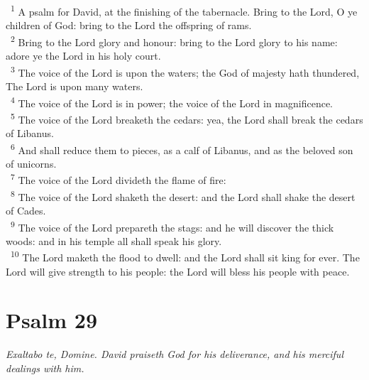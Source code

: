 \documentclass[a5paper,12pt]{article}
\begin{document}
\begin{multicols*}{2}
~\textsuperscript{1} A psalm for David, at the finishing of the tabernacle. Bring to the Lord, O ye children of God: bring to the Lord the offspring of rams.\\
~\textsuperscript{2} Bring to the Lord glory and honour: bring to the Lord glory to his name: adore ye the Lord in his holy court.\\
~\textsuperscript{3} The voice of the Lord is upon the waters; the God of majesty hath thundered, The Lord is upon many waters.\\
~\textsuperscript{4} The voice of the Lord is in power; the voice of the Lord in magnificence.\\
~\textsuperscript{5} The voice of the Lord breaketh the cedars: yea, the Lord shall break the cedars of Libanus.\\
~\textsuperscript{6} And shall reduce them to pieces, as a calf of Libanus, and as the beloved son of unicorns.\\
~\textsuperscript{7} The voice of the Lord divideth the flame of fire:\\
~\textsuperscript{8} The voice of the Lord shaketh the desert: and the Lord shall shake the desert of Cades.\\
~\textsuperscript{9} The voice of the Lord prepareth the stags: and he will discover the thick woods: and in his temple all shall speak his glory.\\
~\textsuperscript{10} The Lord maketh the flood to dwell: and the Lord shall sit king for ever. The Lord will give strength to his people: the Lord will bless his people with peace.\\

\section{Psalm 29}
\label{sec:org596a745}
\emph{Exaltabo te, Domine. David praiseth God for his deliverance, and his merciful dealings with him.}\\


\end{multicols*}
\end{document}
